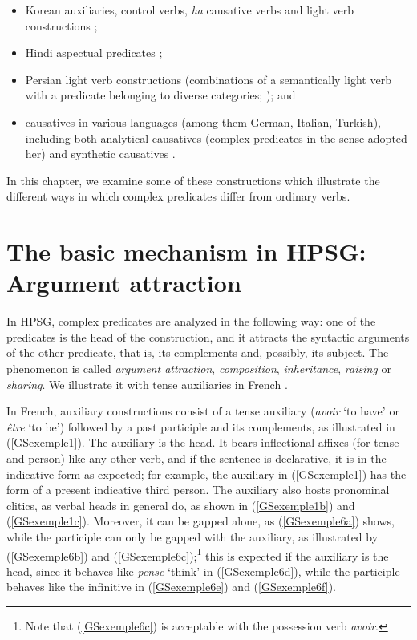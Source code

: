 {\begin{itemize}
	\item Korean auxiliaries, control verbs, \emph{ha} causative verbs and light verb constructions \citep{ Sells1991, Ryu:93, Chung98a-u, lee2001argument, choi2001mixed, Yoo2003, Kim2016a-u};
	
	\item Hindi aspectual predicates \citep{poornima2009hindi}; 
	
	\item Persian light verb constructions (combinations of a semantically light verb with a predicate belonging to diverse categories; \citealt{bonami2010persian, MuellerPersian, pollet2012grammaire, bonami2015diversity}); and  
	
	\item causatives in various languages (among them German, Italian, Turkish), including both analytical causatives (complex predicates in the sense adopted her) and synthetic causatives \citep{Webelhuth98a-u}. 
	
\end{itemize}


In this chapter, we examine some of these constructions which illustrate the different ways in which complex predicates differ from ordinary verbs.


\section{The basic mechanism in HPSG: Argument attraction}\label{GSsection2}
\label{complex-predicates-sec-argument-attraction}

In HPSG, complex predicates are analyzed in the following way: one of the predicates is the head of the construction, and it attracts the syntactic arguments of the other predicate, that is, its complements and, possibly, its subject. The phenomenon is called \emph{argument attraction}, \emph{composition}, \emph{inheritance}, \emph{raising} or \emph{sharing}. We illustrate it with tense auxiliaries in French \citep{abeille1994complementation, AG2002b-u}.

In French, auxiliary constructions consist of a tense auxiliary (\emph{avoir} `to have' or \emph{\^etre} `to be') followed by a past participle and its complements, as illustrated in (\ref{GSexemple1}). The auxiliary is the head.
It bears inflectional affixes (for tense and person) like any other verb, and if the sentence is declarative, it is in the indicative form as expected; for example, the auxiliary in (\ref{GSexemple1}) has the form of a present indicative third person. 
The auxiliary also hosts pronominal clitics, as verbal heads in general do, as shown in (\ref{GSexemple1b}) and (\ref{GSexemple1c}). Moreover, it can be gapped alone, as (\ref{GSexemple6a}) shows, while the participle can only be gapped with the auxiliary, as illustrated by (\ref{GSexemple6b}) and (\ref{GSexemple6c});\footnote{Note that (\ref{GSexemple6c}) is acceptable with the possession verb \emph{avoir}.} this is expected if the auxiliary is the head, since it behaves like \emph{pense} `think' in (\ref{GSexemple6d}), while the participle behaves like the infinitive in (\ref{GSexemple6e}) and (\ref{GSexemple6f}). 

}
